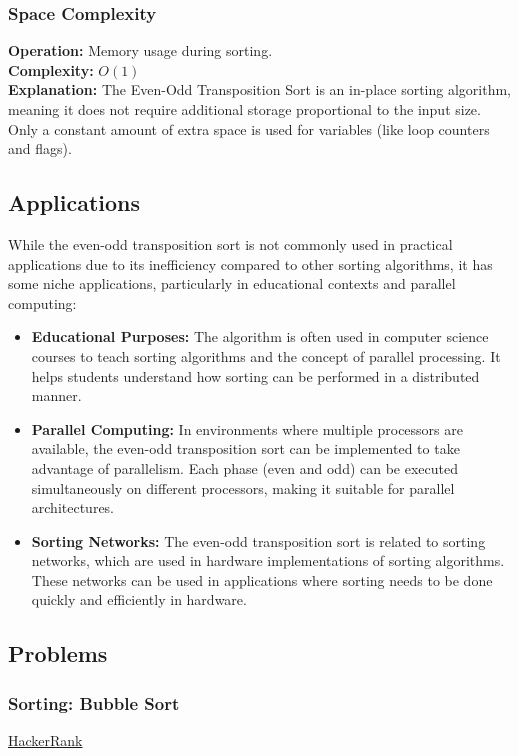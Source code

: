 \subsubsection{Space Complexity}
\textbf{Operation:} Memory usage during sorting. \\
\textbf{Complexity:} $O(1)$ \\
\textbf{Explanation:} The Even-Odd Transposition Sort is an in-place sorting algorithm, meaning it does not require additional storage proportional to the input size. Only a constant amount of extra space is used for variables (like loop counters and flags).

\subsection{Applications}
While the even-odd transposition sort is not commonly used in practical applications due to its inefficiency compared to other sorting algorithms, it has some niche applications, particularly in educational contexts and parallel computing:
\begin{itemize}
    \item \textbf{Educational Purposes:} The algorithm is often used in computer science courses to teach sorting algorithms and the concept of parallel processing. It helps students understand how sorting can be performed in a distributed manner.
    \item \textbf{Parallel Computing:} In environments where multiple processors are available, the even-odd transposition sort can be implemented to take advantage of parallelism. Each phase (even and odd) can be executed simultaneously on different processors, making it suitable for parallel architectures.
    \item \textbf{Sorting Networks:} The even-odd transposition sort is related to sorting networks, which are used in hardware implementations of sorting algorithms. These networks can be used in applications where sorting needs to be done quickly and efficiently in hardware.
\end{itemize}

\subsection{Problems}

\subsubsection{Sorting: Bubble Sort}
\href{https://www.hackerrank.com/challenges/30-sorting/problem}{HackerRank}

